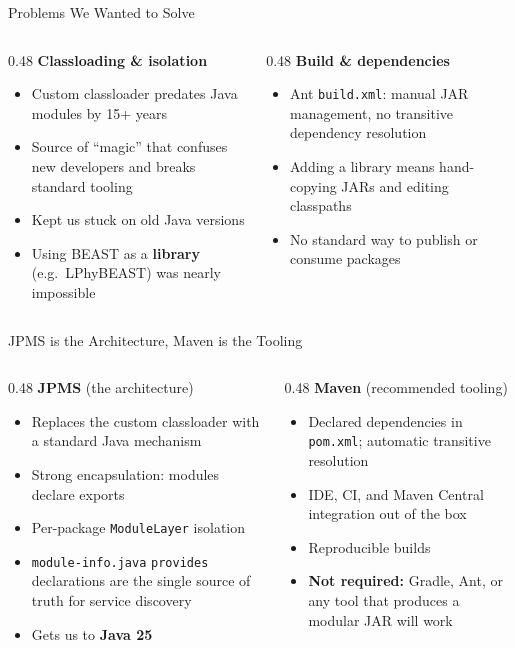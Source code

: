 \documentclass[aspectratio=169,11pt]{beamer}
\newcommand{\code}[1]{\texttt{#1}}
\begin{document}
\begin{frame}{Problems We Wanted to Solve}
\begin{columns}[T]
\begin{column}{0.48\textwidth}
\textbf{Classloading \& isolation}
\begin{itemize}
\item Custom classloader predates Java modules by 15+ years
\item Source of ``magic'' that confuses new developers and breaks standard tooling
\item Kept us stuck on old Java versions
\item Using BEAST as a \textbf{library} (e.g.\ LPhyBEAST) was nearly impossible
\end{itemize}
\end{column}
\begin{column}{0.48\textwidth}
\textbf{Build \& dependencies}
\begin{itemize}
\item Ant \code{build.xml}: manual JAR management, no transitive dependency resolution
\item Adding a library means hand-copying JARs and editing classpaths
\item No standard way to publish or consume packages
\end{itemize}
\end{column}
\end{columns}
\end{frame}

\begin{frame}{JPMS is the Architecture, Maven is the Tooling}
\begin{columns}[T]
\begin{column}{0.48\textwidth}
\textbf{JPMS} (the architecture)
\begin{itemize}
\item Replaces the custom classloader with a standard Java mechanism
\item Strong encapsulation: modules declare exports
\item Per-package \code{ModuleLayer} isolation
\item \code{module-info.java} \code{provides} declarations are the single source of truth for service discovery
\item Gets us to \textbf{Java 25}
\end{itemize}
\end{column}
\begin{column}{0.48\textwidth}
\textbf{Maven} (recommended tooling)
\begin{itemize}
\item Declared dependencies in \code{pom.xml}; automatic transitive resolution
\item IDE, CI, and Maven Central integration out of the box
\item Reproducible builds
\item \textbf{Not required:} Gradle, Ant, or any tool that produces a modular JAR will work
\end{itemize}
\end{column}
\end{columns}
\end{frame}
\end{document}
